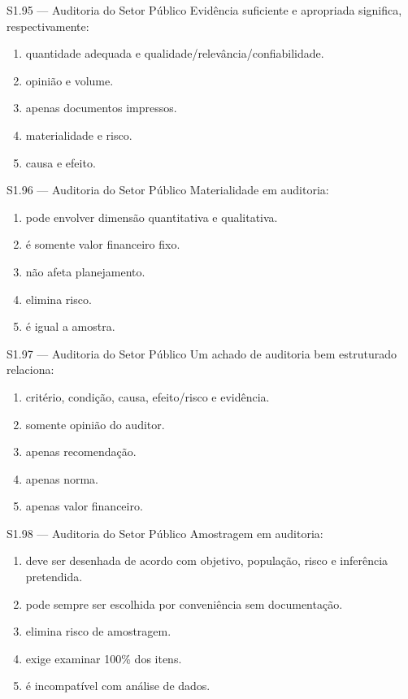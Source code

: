\begin{questao}{S1.95 — Auditoria do Setor Público}
Evidência suficiente e apropriada significa, respectivamente:
\begin{enumerate}[label=\Alph*)]\item quantidade adequada e qualidade/relevância/confiabilidade.\item opinião e volume.\item apenas documentos impressos.\item materialidade e risco.\item causa e efeito.\end{enumerate}
\end{questao}

\begin{questao}{S1.96 — Auditoria do Setor Público}
Materialidade em auditoria:
\begin{enumerate}[label=\Alph*)]\item pode envolver dimensão quantitativa e qualitativa.\item é somente valor financeiro fixo.\item não afeta planejamento.\item elimina risco.\item é igual a amostra.\end{enumerate}
\end{questao}

\begin{questao}{S1.97 — Auditoria do Setor Público}
Um achado de auditoria bem estruturado relaciona:
\begin{enumerate}[label=\Alph*)]\item critério, condição, causa, efeito/risco e evidência.\item somente opinião do auditor.\item apenas recomendação.\item apenas norma.\item apenas valor financeiro.\end{enumerate}
\end{questao}

\begin{questao}{S1.98 — Auditoria do Setor Público}
Amostragem em auditoria:
\begin{enumerate}[label=\Alph*)]\item deve ser desenhada de acordo com objetivo, população, risco e inferência pretendida.\item pode sempre ser escolhida por conveniência sem documentação.\item elimina risco de amostragem.\item exige examinar 100\% dos itens.\item é incompatível com análise de dados.\end{enumerate}
\end{questao}

